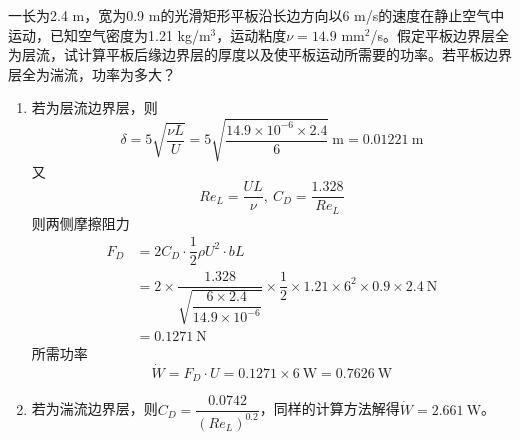 \begin{example}
	一长为2.4 m，宽为0.9 m的光滑矩形平板沿长边方向以6 m/s的速度在静止空气中运动，已知空气密度为1.21 kg/m$^3$，运动粘度$\nu = 14.9$ mm$^2$/s。假定平板边界层全为层流，试计算平板后缘边界层的厚度以及使平板运动所需要的功率。若平板边界层全为湍流，功率为多大？
	
	\begin{enumerate}
		\item 若为层流边界层，则
		\begin{equation*}
			\delta = 5\sqrt{\dfrac{\nu L}{U}} = 5\sqrt{\dfrac{14.9 \times 10^{-6} \times 2.4}{6}} \mathrm{~m} = 0.01221 \mathrm{~m}
		\end{equation*}
	    又
	    \begin{equation*}
	    	Re_L = \dfrac{UL}{\nu}, ~C_D = \dfrac{1.328}{Re_L}
	    \end{equation*}
        则两侧摩擦阻力
        \begin{align*}
        	F_D &= 2C_D \cdot \dfrac{1}{2} \rho U^2 \cdot bL\\
        	&= 2\times \dfrac{1.328}{\sqrt{\dfrac{6 \times 2.4}{14.9 \times 10^{-6}}}} \times \dfrac{1}{2} \times 1.21 \times 6^2 \times 0.9 \times 2.4 \mathrm{~N}\\
        	&= 0.1271 \mathrm{~N}
        \end{align*}
        所需功率
        \begin{equation*}
        	\dot{W} = F_D \cdot U = 0.1271 \times 6 \mathrm{~W} = 0.7626 \mathrm{~W}
        \end{equation*}
        \item 若为湍流边界层，则$C_D = \dfrac{0.0742}{(Re_L)^{0.2}}$，同样的计算方法解得$\dot{W} = 2.661 \mathrm{~W}$。
	\end{enumerate}
\end{example}
